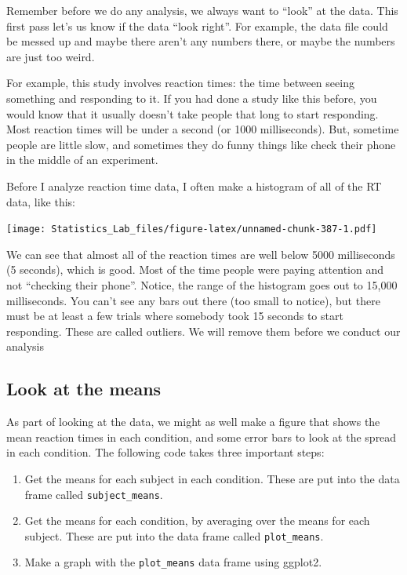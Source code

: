\documentclass[
]{book}
\newenvironment{Shaded}{\begin{snugshade}}{\end{snugshade}}
\newcommand{\FunctionTok}[1]{\textcolor[rgb]{0.00,0.00,0.00}{#1}}
\newcommand{\NormalTok}[1]{#1}
\newcommand{\SpecialCharTok}[1]{\textcolor[rgb]{0.00,0.00,0.00}{#1}}
\providecommand{\tightlist}{%
  \setlength{\itemsep}{0pt}\setlength{\parskip}{0pt}}
\begin{document}
Remember before we do any analysis, we always want to ``look'' at the data. This first pass let's us know if the data ``look right''. For example, the data file could be messed up and maybe there aren't any numbers there, or maybe the numbers are just too weird.

For example, this study involves reaction times: the time between seeing something and responding to it. If you had done a study like this before, you would know that it usually doesn't take people that long to start responding. Most reaction times will be under a second (or 1000 milliseconds). But, sometime people are little slow, and sometimes they do funny things like check their phone in the middle of an experiment.

Before I analyze reaction time data, I often make a histogram of all of the RT data, like this:

\begin{Shaded}
\end{Shaded}

\texttt{[image: Statistics\_Lab\_files/figure-latex/unnamed-chunk-387-1.pdf]}

We can see that almost all of the reaction times are well below 5000 milliseconds (5 seconds), which is good. Most of the time people were paying attention and not ``checking their phone''. Notice, the range of the histogram goes out to 15,000 milliseconds. You can't see any bars out there (too small to notice), but there must be at least a few trials where somebody took 15 seconds to start responding. These are called outliers. We will remove them before we conduct our analysis

\hypertarget{look-at-the-means}{%
\subsection{Look at the means}\label{look-at-the-means}}

As part of looking at the data, we might as well make a figure that shows the mean reaction times in each condition, and some error bars to look at the spread in each condition. The following code takes three important steps:

\begin{enumerate}
\def\labelenumi{\arabic{enumi}.}
\tightlist
\item
  Get the means for each subject in each condition. These are put into the data frame called \texttt{subject\_means}.
\item
  Get the means for each condition, by averaging over the means for each subject. These are put into the data frame called \texttt{plot\_means}.
\item
  Make a graph with the \texttt{plot\_means} data frame using ggplot2.
\end{enumerate}
\end{document}
